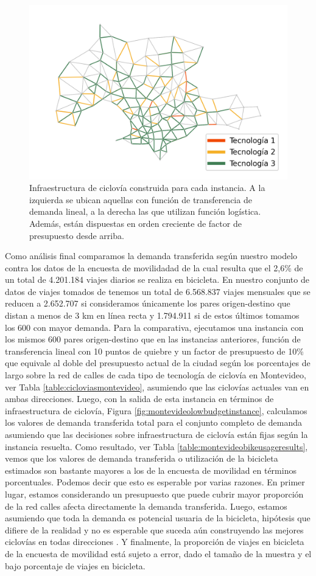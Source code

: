 \begin{figure}[h!]
  \includegraphics[width=.49\linewidth]{../resources/montevideo_d3000.0_inv_logit_1.6_budget_factor.png}
  \caption{Infraestructura de ciclovía construida para cada instancia. A la izquierda se ubican aquellas con función de transferencia de demanda lineal, a la derecha las que utilizan función logística. Además, están dispuestas en orden creciente de factor de presupuesto desde arriba.}
  \label{fig:montevideo_instances_infras}
\end{figure}

Como análisis final comparamos la demanda transferida según nuestro modelo contra los datos de la encuesta de movilidadad \textcite{Mauttone2017a} de la cual resulta que el 2,6\% de un total de 4.201.184 viajes diarios se realiza en bicicleta. En nuestro conjunto de datos de viajes tomados de \textcite{Massobrio2020} tenemos un total de 6.568.837 viajes mensuales que se reducen a 2.652.707 si consideramos únicamente los pares origen-destino que distan a menos de 3 km en línea recta y 1.794.911 si de estos últimos tomamos los 600 con mayor demanda. Para la comparativa, ejecutamos una instancia con los mismos 600 pares origen-destino que en las instancias anteriores, función de transferencia lineal con 10 puntos de quiebre y un factor de presupuesto de 10\% que equivale al doble del presupuesto actual de la ciudad según los porcentajes de largo sobre la red de calles de cada tipo de tecnología de ciclovía en Montevideo, ver Tabla \ref{table:cicloviasmontevideo}, asumiendo que las ciclovías actuales van en ambas direcciones. Luego, con la salida de esta instancia en términos de infraestructura de ciclovía, Figura \ref{fig:montevideolowbudgetinstance}, calculamos los valores de demanda transferida total para el conjunto completo de demanda asumiendo que las decisiones sobre infraestructura de ciclovía están fijas según la instancia resuelta. Como resultado, ver Tabla \ref{table:montevideobikeusageresults}, vemos que los valores de demanda transferida o utilización de la bicicleta estimados son bastante mayores a los de la encuesta de movilidad en términos porcentuales. Podemos decir que esto es esperable por varias razones. En primer lugar, estamos considerando un presupuesto que puede cubrir mayor proporción de la red calles afecta directamente la demanda transferida. Luego, estamos asumiendo que toda la demanda es potencial usuaria de la bicicleta, hipótesis que difiere de la realidad y no es esperable que suceda aún construyendo las mejores ciclovías en todas direcciones \parencite{shwe2014}. Y finalmente, la proporción de viajes en bicicleta de la encuesta de movilidad está sujeto a error, dado el tamaño de la muestra y el bajo porcentaje de viajes en bicicleta.

